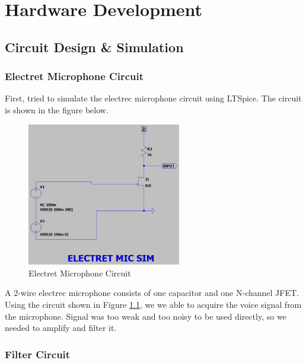 \chapter{Hardware Development}

\section{Circuit Design \& Simulation}

\subsection{Electret Microphone Circuit}
First, tried to simulate the electrec microphone circuit using LTSpice. The circuit is shown in the figure below.

\begin{figure}[h]
	\centering
	\includegraphics[width=0.6\textwidth]{assets/mic_circuit.png}
	\caption{Electret Microphone Circuit}
	\label{fig:mic_circuit}
\end{figure}

A 2-wire electrec microphone consists of one capacitor and one N-channel JFET. Using the circuit shown in Figure \ref{fig:mic_circuit}, we we able to acquire the voice signal from the microphone. Signal was too weak and too noisy to be used directly, so we needed to amplify and filter it.

\newpage
\thispagestyle{plain}

\subsection{Filter Circuit}

